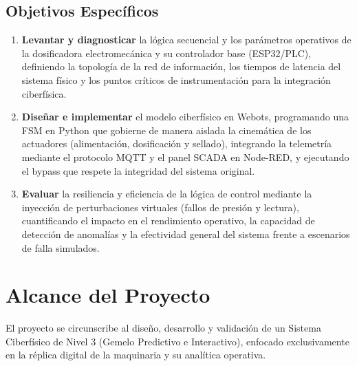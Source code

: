 \subsection{Objetivos Específicos}
\begin{enumerate}
  \item \textbf{Levantar y diagnosticar} la lógica secuencial y los parámetros operativos de la dosificadora electromecánica y su controlador base (ESP32/PLC), definiendo la topología de la red de información, los tiempos de latencia del sistema físico y los puntos críticos de instrumentación para la integración ciberfísica.
  \item \textbf{Diseñar e implementar} el modelo ciberfísico en Webots, programando una FSM en Python que gobierne de manera aislada la cinemática de los actuadores (alimentación, dosificación y sellado), integrando la telemetría mediante el protocolo MQTT y el panel SCADA en Node-RED, y ejecutando el bypass que respete la integridad del sistema original.
  \item \textbf{Evaluar} la resiliencia y eficiencia de la lógica de control mediante la inyección de perturbaciones virtuales (fallos de presión y lectura), cuantificando el impacto en el rendimiento operativo, la capacidad de detección de anomalías y la efectividad general del sistema frente a escenarios de falla simulados.
\end{enumerate}

\section{Alcance del Proyecto}

El proyecto se circunscribe al diseño, desarrollo y validación de un Sistema Ciberfísico de Nivel 3 (Gemelo Predictivo e Interactivo), enfocado exclusivamente en la réplica digital de la maquinaria y su analítica operativa.

